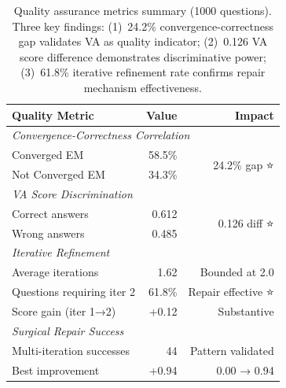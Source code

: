 
\begin{table}[t]
\centering
\caption{Quality assurance metrics summary (1000 questions). Three key findings:
(1)~24.2\% convergence-correctness gap validates VA as quality indicator;
(2)~0.126 VA score difference demonstrates discriminative power;
(3)~61.8\% iterative refinement rate confirms repair mechanism effectiveness.}
\label{tab:quality_metrics_compact}
\small
\begin{tabular}{lrr}
\toprule
\textbf{Quality Metric} & \textbf{Value} & \textbf{Impact} \\
\midrule
\multicolumn{3}{l}{\textit{Convergence-Correctness Correlation}} \\
\quad Converged EM                  & 58.5\% & \multirow{2}{*}{24.2\% gap ⭐} \\
\quad Not Converged EM              & 34.3\% & \\
\midrule
\multicolumn{3}{l}{\textit{VA Score Discrimination}} \\
\quad Correct answers               & 0.612  & \multirow{2}{*}{0.126 diff ⭐} \\
\quad Wrong answers                 & 0.485  & \\
\midrule
\multicolumn{3}{l}{\textit{Iterative Refinement}} \\
\quad Average iterations            & 1.62   & Bounded at 2.0 \\
\quad Questions requiring iter 2    & 61.8\% & Repair effective ⭐ \\
\quad Score gain (iter 1→2)         & +0.12  & Substantive \\
\midrule
\multicolumn{3}{l}{\textit{Surgical Repair Success}} \\
\quad Multi-iteration successes     & 44     & Pattern validated \\
\quad Best improvement              & +0.94  & 0.00 → 0.94 \\
\bottomrule
\end{tabular}
\end{table}

